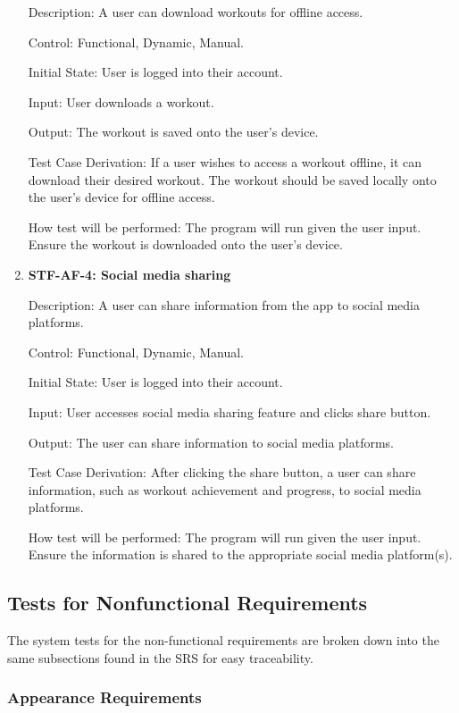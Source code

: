 \documentclass[12pt, titlepage]{article}
\begin{document}
\begin{enumerate}
        Description: A user can download workouts for offline access.

        Control: Functional, Dynamic, Manual.

        Initial State: User is logged into their account.

        Input: User downloads a workout.

        Output: The workout is saved onto the user’s device.

        Test Case Derivation: If a user wishes to access a workout offline, it can download their desired workout. The workout should be saved locally onto the user’s device for offline access.

        How test will be performed: The program will run given the user input. Ensure the workout is downloaded onto the user’s device.

        \item{\textbf{STF-AF-4: Social media sharing}\\}

        Description: A user can share information from the app to social media platforms.

        Control: Functional, Dynamic, Manual.

        Initial State: User is logged into their account.

        Input: User accesses social media sharing feature and clicks share button.

        Output: The user can share information to social media platforms.

        Test Case Derivation: After clicking the share button, a user can share information, such as workout achievement and progress, to social media platforms.

        How test will be performed: The program will run given the user input. Ensure the information is shared to the appropriate social media platform(s).


    \end{enumerate}

    \subsection{Tests for Nonfunctional Requirements}

    The system tests for the non-functional requirements are broken down into the same subsections found in the SRS for easy traceability.

    \subsubsection{Appearance Requirements }
\end{document}
